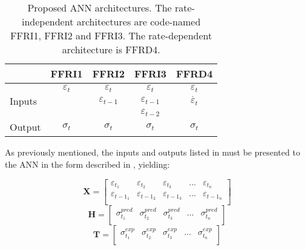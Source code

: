 \begin{table}[htbp!]
    \centering
    \caption{Proposed ANN architectures. The rate-independent architectures are code-named FFRI1, FFRI2 and FFRI3. The rate-dependent architecture is FFRD4.}
    \begin{tabular}{lcccc}
    \toprule
                            & FFRI1               & FFRI2                   & FFRI3                   & FFRD4\\
    \hline
    \multirow{3}{*}{Inputs} & $\varepsilon_t$   & $\varepsilon_t$       & $\varepsilon_t$       & $\varepsilon_t$       \\
                            &                   & $\varepsilon_{t-1}$   & $\varepsilon_{t-1}$   & $\Dot{\varepsilon_t}$ \\
                            &                   &                       & $\varepsilon_{t-2}$   &                       \\
    \hline
    Output                  & $\sigma_t$        & $\sigma_t$            & $\sigma_t$            & $\sigma_t$            \\
    \bottomrule
    \end{tabular}
    \label{tbl:ANNArchitectures}
\end{table}

As previously mentioned, the inputs and outputs listed in  must be presented to the ANN in the form described in , yielding:

\begin{equation}
    \mathbf{X} = 
        \begin{bmatrix}
            \varepsilon_{t_1}  & \varepsilon_{t_2}       & \varepsilon_{t_3}      & ... & \varepsilon_{t_n} \\ 
            \varepsilon_{{t-1}_1}& \varepsilon_{{t-1}_2}  & \varepsilon_{{t-1}_3}  & ... & \varepsilon_{{t-1}_n} \\
        \end{bmatrix}
\end{equation}
\begin{equation}
    \mathbf{H} = 
        \begin{bmatrix}
            \sigma^{pred}_{t_1}  & \sigma^{pred}_{t_2}       & \sigma^{pred}_{t_3}      & ... & \sigma^{pred}_{t_n} \\ 
        \end{bmatrix}
\end{equation}
\begin{equation}
    \mathbf{T} = 
        \begin{bmatrix}
            \sigma^{exp}_{t_1}  & \sigma^{exp}_{t_2}       & \sigma^{exp}_{t_3}      & ... & \sigma^{exp}_{t_n} \\ 
        \end{bmatrix}
\end{equation}

